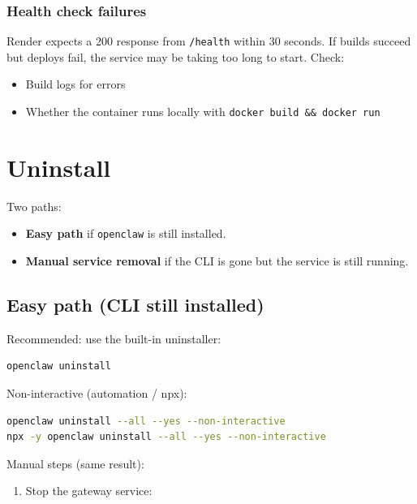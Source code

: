 \subsubsection{Health check failures}


Render expects a 200 response from \texttt{/health} within 30 seconds. If builds succeed but deploys fail, the service may be taking too long to start. Check:

\begin{itemize}
  \item Build logs for errors
  \item Whether the container runs locally with \texttt{docker build \&\& docker run}
\end{itemize}



\clearpage

\section{Uninstall}


Two paths:

\begin{itemize}
  \item \textbf{Easy path} if \texttt{openclaw} is still installed.
  \item \textbf{Manual service removal} if the CLI is gone but the service is still running.
\end{itemize}


\subsection{Easy path (CLI still installed)}


Recommended: use the built-in uninstaller:

\begin{lstlisting}[language=bash]
openclaw uninstall
\end{lstlisting}


Non-interactive (automation / npx):

\begin{lstlisting}[language=bash]
openclaw uninstall --all --yes --non-interactive
npx -y openclaw uninstall --all --yes --non-interactive
\end{lstlisting}


Manual steps (same result):

\begin{enumerate}
  \item Stop the gateway service:
\end{enumerate}


